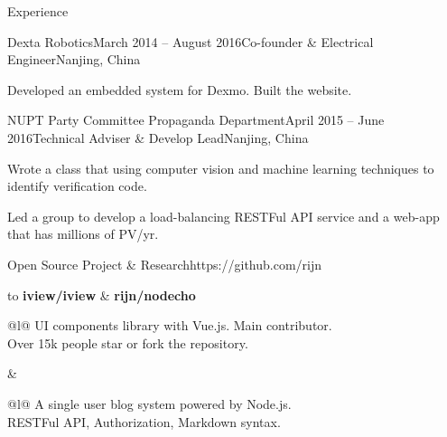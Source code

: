 \documentclass{resume} %
\begin{document}
\begin{rSection}{Experience}

\begin{rSubsection}{Dexta Robotics}{March 2014 -- August 2016}{Co-founder \& Electrical Engineer}{Nanjing, China}

\item Developed an embedded system for Dexmo. Built the website.

\end{rSubsection}


\begin{rSubsection}{NUPT Party Committee Propaganda Department}{April 2015 -- June 2016}{Technical Adviser \& Develop Lead}{Nanjing, China}
\item Wrote a class that using computer vision and machine learning techniques to identify verification code.
\item Led a group to develop a load-balancing RESTFul API service and a web-app that has millions of PV/yr.
\end{rSubsection}

\end{rSection}


\begin{rSection}{Open Source Project \& Research}{https://github.com/rijn}

\begin{tabu} to 
{\bf iview/iview} & {\bf rijn/nodecho}\\
\begin{tabu}{@{}l@{}}
	UI components library with Vue.js. Main contributor. \\
	Over 15k people star or fork the repository.
\end{tabu}
&
\begin{tabu}{@{}l@{}}
	A single user blog system powered by Node.js.\\
	RESTFul API, Authorization, Markdown syntax.\\
\end{tabu}\\
\end{tabu}

\end{rSection}
\end{document}

